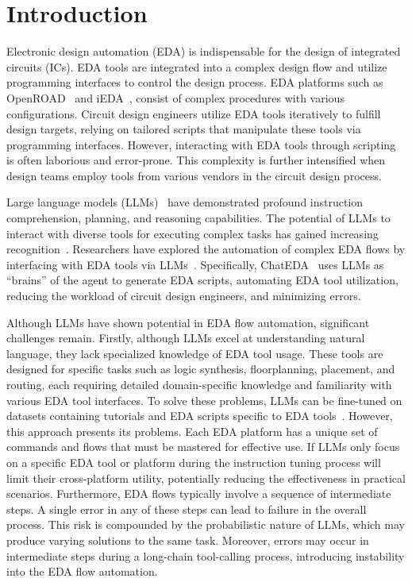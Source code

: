 \section{Introduction}
Electronic design automation (EDA) is indispensable for the design of integrated circuits (ICs).
EDA tools are integrated into a complex design flow and utilize programming interfaces to control the design process.
EDA platforms such as OpenROAD~\cite{ajayi2019openroad} and iEDA~\cite{li2024ieda}, consist of complex procedures with various configurations.
Circuit design engineers utilize EDA tools iteratively to fulfill design targets, relying on tailored scripts that manipulate these tools via programming interfaces.
However, interacting with EDA tools through scripting~\cite{chen2001scripteda} is often laborious and error-prone. 
This complexity is further intensified when design teams employ tools from various vendors in the circuit design process.

Large language models (LLMs)~\cite{openai2023gpt4, 2024claude, dubey2024llama3} have demonstrated profound instruction comprehension, planning, and reasoning capabilities. 
The potential of LLMs to interact with diverse tools for executing complex tasks has gained increasing recognition~\cite{qin2023toolllm}. 
Researchers have explored the automation of complex EDA flows by interfacing with EDA tools via LLMs~\cite{wu2024chateda, liu2023chipnemo}.
Specifically, ChatEDA~\cite{wu2024chateda} uses LLMs as ``brains'' of the agent to generate EDA scripts, automating EDA tool utilization, reducing the workload of circuit design engineers, and minimizing errors.

Although LLMs have shown potential in EDA flow automation, significant challenges remain.
Firstly, although LLMs excel at understanding natural language, they lack specialized knowledge of EDA tool usage.
These tools are designed for specific tasks such as logic synthesis, floorplanning, placement, and routing, each requiring detailed domain-specific knowledge and familiarity with various EDA tool interfaces.
To solve these problems, LLMs can be fine-tuned on datasets containing tutorials and EDA scripts specific to EDA tools~\cite{wu2024chateda}.
However, this approach presents its problems.
Each EDA platform has a unique set of commands and flows that must be mastered for effective use. 
If LLMs only focus on a specific EDA tool or platform during the instruction tuning process will limit their cross-platform utility, potentially reducing the effectiveness in practical scenarios.
Furthermore, EDA flows typically involve a sequence of intermediate steps. 
A single error in any of these steps can lead to failure in the overall process.
This risk is compounded by the probabilistic nature of LLMs, which may produce varying solutions to the same task. 
Moreover, errors may occur in intermediate steps during a long-chain tool-calling process, introducing instability into the EDA flow automation.

